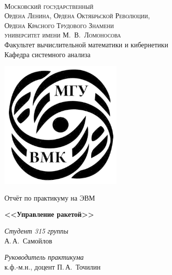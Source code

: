 \documentclass[10pt,pdf,hyperref={unicode}]{beamer}
\begin{document}
	
	\thispagestyle{empty}
	
	\begin{center}
		\ \vspace{-3cm}
		
		{\scshape Московский государственный\\
		Ордена Ленина, Ордена Октябрьской Революции,\\
		Ордена Красного Трудового Знамени\\
		университет имени М.~В.~Ломоносова}\\
		Факультет вычислительной математики и кибернетики\\
		Кафедра системного анализа
		
		\vspace{1cm}
		\begin{center}
		{\includegraphics[width=6cm]{mgu}}
		\end{center}
		\vspace{1cm}
		
		{\LARGE Отчёт по практикуму на ЭВМ}
		
		\vspace{1cm}
		
		{\Huge\bfseries <<Управление ракетой>>}
		\end{center}
		
		\vspace{1cm}
		
		\begin{flushright}
		  \large
		  \textit{Студент 315 группы}\\
		  А.\,А.~Самойлов
		
		  \vspace{5mm}
		
		  \textit{Руководитель практикума}\\
		  к.ф.-м.н., доцент П.\,А.~Точилин
		\end{flushright}
		
		\vspace{5cm}
		
\end{document}
